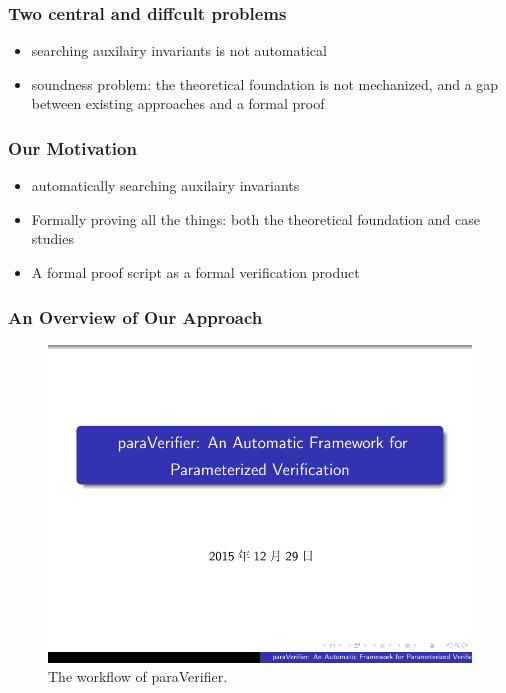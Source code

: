 \documentclass{beamer}
\begin{document}
\begin{frame}\frametitle{Two central and diffcult problems}
\begin{itemize}
\item  searching auxilairy invariants is not automatical
\item  soundness problem: the theoretical foundation is not mechanized, and a gap between existing
approaches and a formal proof
\end{itemize}

\end{frame}

\begin{frame}\frametitle{Our Motivation}

\begin{itemize}
\item automatically searching  auxilairy invariants
\item Formally proving all the things: both the theoretical foundation and case studies
\item A formal proof script as a formal verification product
\end{itemize}
\end{frame}


\begin{frame}\frametitle{An Overview of Our Approach}


\begin{figure}[!t]
\centering %
\vspace{-0.8cm}
\includegraphics[width=1.0\textwidth]{paraVerifier.pdf}
\vspace{-0.6cm}
\caption{The workflow of {\sf paraVerifier}.}
\label{fig:arch}
\end{figure}
\end{frame}
\end{document}
